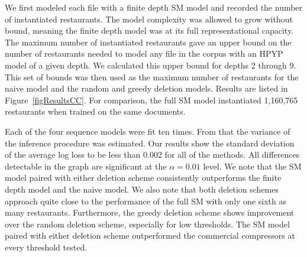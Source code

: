 
We first modeled each file with a finite depth SM model and recorded the number of instantiated restaurants.  The model complexity was allowed to grow without bound, meaning the finite depth model was at its full representational capacity.  The maximum number of instantiated restaurants gave an upper bound on the number of restaurants needed to model any file in the corpus with an HPYP model of a given depth.  We calculated this upper bound for depths 2 through 9.  This set of bounds was then used as the maximum number of restaurants for the naive model and the random and greedy deletion models.  Results are listed in Figure~\ref{figResultsCC}.  For comparison, the full SM model instantiated 1,160,765 restaurants when trained on the same documents.  

Each of the four sequence models were fit ten times.  From that the variance of the inference procedure was estimated.  Our results show the standard deviation of the average log loss to be less than $0.002$ for all of the methods.  All differences detectable in the graph are significant at the $\alpha = 0.01$ level. We note that the SM model paired with either deletion scheme consistently outperforms the finite depth model and the naive model.  We also note that both deletion schemes approach quite close to the performance of the full SM with only one sixth as many restaurants.  Furthermore, the greedy deletion scheme shows improvement over the random deletion scheme, especially for low thresholds.  The SM model paired with either deletion scheme outperformed the commercial compressors at every threshold tested.
